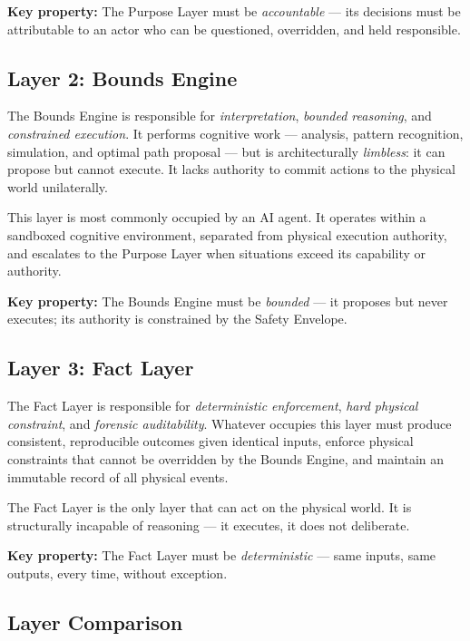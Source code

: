 \documentclass[12pt]{article}
\begin{document}
\textbf{Key property:} The Purpose Layer must be \textit{accountable} --- its decisions must be attributable to an actor who can be questioned, overridden, and held responsible.

\subsection{Layer 2: Bounds Engine}
The Bounds Engine is responsible for \textit{interpretation}, \textit{bounded reasoning}, and \textit{constrained execution}. It performs cognitive work --- analysis, pattern recognition, simulation, and optimal path proposal --- but is architecturally \textit{limbless}: it can propose but cannot execute. It lacks authority to commit actions to the physical world unilaterally.

This layer is most commonly occupied by an AI agent. It operates within a sandboxed cognitive environment, separated from physical execution authority, and escalates to the Purpose Layer when situations exceed its capability or authority.

\textbf{Key property:} The Bounds Engine must be \textit{bounded} --- it proposes but never executes; its authority is constrained by the Safety Envelope.

\subsection{Layer 3: Fact Layer}
The Fact Layer is responsible for \textit{deterministic enforcement}, \textit{hard physical constraint}, and \textit{forensic auditability}. Whatever occupies this layer must produce consistent, reproducible outcomes given identical inputs, enforce physical constraints that cannot be overridden by the Bounds Engine, and maintain an immutable record of all physical events.

The Fact Layer is the only layer that can act on the physical world. It is structurally incapable of reasoning --- it executes, it does not deliberate.

\textbf{Key property:} The Fact Layer must be \textit{deterministic} --- same inputs, same outputs, every time, without exception.

\subsection{Layer Comparison}
\end{document}
